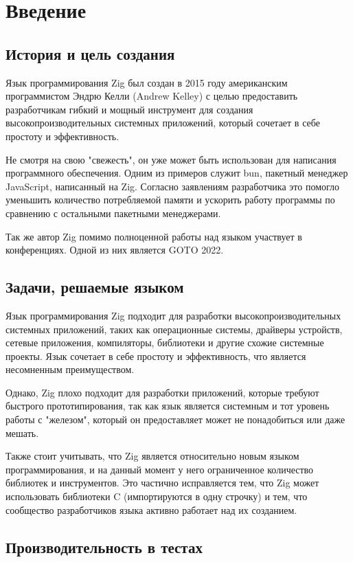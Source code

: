 \section{Введение}

\subsection{История и цель создания}

Язык программирования Zig был создан в 2015 году американским программистом Эндрю Келли (Andrew Kelley) с целью предоставить разработчикам гибкий и мощный инструмент для создания высокопроизводительных системных приложений, который сочетает в себе простоту и эффективность.

Не смотря на свою "свежесть", он уже может быть использован для написания программного обеспечения. Одним из примеров служит bun, пакетный менеджер JavaScript, написанный на Zig. Согласно заявлениям разработчика это помогло уменьшить количество потребляемой памяти и ускорить работу программы по сравнению с остальными пакетными менеджерами.

Так же автор Zig помимо полноценной работы над языком участвует в конференциях. Одной из них является GOTO 2022.

\subsection{Задачи, решаемые языком}

Язык программирования Zig подходит для разработки высокопроизводительных системных приложений, таких как операционные системы, драйверы устройств, сетевые приложения, компиляторы, библиотеки и другие схожие системные проекты. Язык сочетает в себе простоту и эффективность, что является несомненным преимуществом.

Однако, Zig плохо подходит для разработки приложений, которые требуют быстрого прототипирования, так как язык является системным и тот уровень работы с "железом", который он предоставляет может не понадобиться или даже мешать.

Также стоит учитывать, что Zig является относительно новым языком программирования, и на данный момент у него ограниченное количество библиотек и инструментов. Это частично исправляется тем, что Zig может использовать библиотеки C (импортируются в одну строчку) и тем, что сообщество разработчиков языка активно работает над их созданием.

\subsection{Производительность в тестах}

